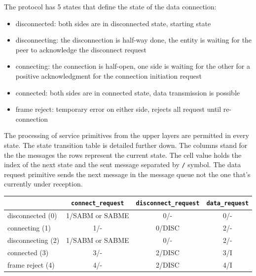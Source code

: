 \documentclass[a4paper]{article}
\begin{document}
The protocol has 5 states that define the state of the data connection:
\begin{itemize}
    \item disconnected: both sides are in disconnected state, starting state
    \item disconnecting: the disconnection is half-way done, the entity is waiting for the peer to acknowledge the
          disconnect request
    \item connecting: the connection is half-open, one side is waiting for the other for a positive acknowledgment for
          the
          connection initiation request
    \item connected: both sides are in connected state, data transmission is possible
    \item frame reject: temporary error on either side, rejects all request until re-connection
\end{itemize}

The processing of service primitives from the upper layers are permitted in every state. The state transition table is
detailed further down. The columns stand for the the messages the rows represent the current state. The cell value
holds the index of the next state and the sent message separated by \verb./. symbol. The data
request primitive sends the next message in the message queue not the one that's currently under reception.

{\footnotesize
\begin{center}
    \begin{tabular}{|l|c|c|c|}
        \hline
                          & \verb!connect_request! & \verb!disconnect_request! & \verb!data_request!  \\
        \hline
        disconnected (0)  & 1/SABM or SABME             & 0/-                         & 0/-                          \\
        \hline
        connecting (1)    & 1/-                         & 0/DISC                      & 2/-                          \\
        \hline
        disconnecting (2) & 1/SABM or SABME             & 0/-                         & 2/-                          \\
        \hline
        connected (3)     & 3/-                         & 2/DISC                      & 3/I                          \\
        \hline
        frame reject (4)  & 4/-                         & 2/DISC                      & 4/I                          \\
        \hline
    \end{tabular}
\end{center}
}
\end{document}

